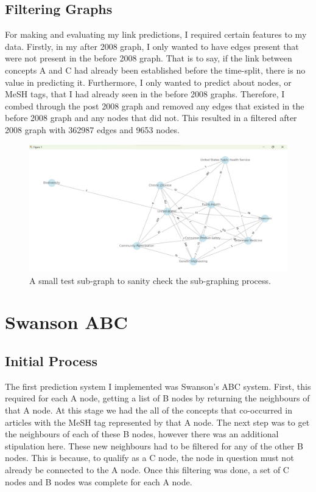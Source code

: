 \documentclass{l4proj}
\begin{document}
\subsection{Filtering Graphs}

For making and evaluating my link predictions, I required certain features to my data. Firstly, in my after 2008 graph, I only wanted to have edges present that were not present in the before 2008 graph. That is to say, if the link between concepts A and C had already been established before the time-split, there is no value in predicting it. Furthermore, I only wanted to predict about nodes, or MeSH tags, that I had already seen in the before 2008 graphs. Therefore, I combed through the post 2008 graph and removed any edges that existed in the before 2008 graph and any nodes that did not. This resulted in a filtered after 2008 graph with 362987 edges and 9653 nodes. \\

\begin{figure}[h]
    \centering
    \includegraphics[width=\linewidth]{images/test_subgraph.png}
    \caption{A small test sub-graph to sanity check the sub-graphing process.}
    \label{fig:test_subgraph}
\end{figure}

\section{Swanson ABC}

\subsection{Initial Process}

The first prediction system I implemented was Swanson's ABC system. First, this required for each A node, getting a list of B nodes by returning the neighbours of that A node. At this stage we had the all of the concepts that co-occurred in articles with the MeSH tag represented by that A node. The next step was to get the neighbours of each of these B nodes, however there was an additional stipulation here. These new neighbours had to be filtered for any of the other B nodes. This is because, to qualify as a C node, the node in question must not already be connected to the A node. Once this filtering was done, a set of C nodes and B nodes was complete for each A node. \\
\end{document}

